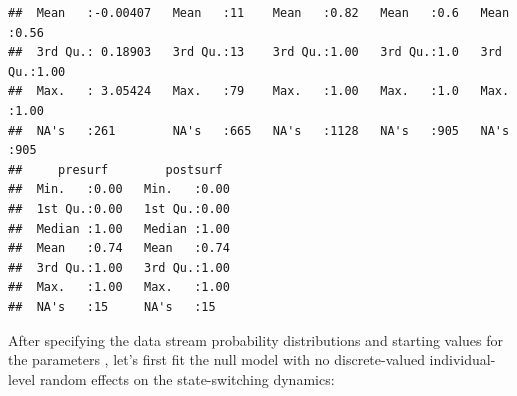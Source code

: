 \documentclass[12pt]{article}\usepackage[]{graphicx}\usepackage[]{xcolor}
\makeatletter
\newenvironment{kframe}{%
 \def\at@end@of@kframe{}%
 \ifinner\ifhmode%
  \def\at@end@of@kframe{\end{minipage}}%
  \begin{minipage}{\columnwidth}%
 \fi\fi%
 \def\FrameCommand##1{\hskip\@totalleftmargin \hskip-\fboxsep
 \colorbox{shadecolor}{##1}\hskip-\fboxsep
     \hskip-\linewidth \hskip-\@totalleftmargin \hskip\columnwidth}%
 \MakeFramed {\advance\hsize-\width
   \@totalleftmargin\z@ \linewidth\hsize
   \@setminipage}}%
 {\par\unskip\endMakeFramed%
 \at@end@of@kframe}
\newenvironment{knitrout}{}{} %
\makeatother
\begin{document}
\begin{knitrout}
\begin{kframe}
\begin{verbatim}
##  Mean   :-0.00407   Mean   :11    Mean   :0.82   Mean   :0.6   Mean   :0.56  
##  3rd Qu.: 0.18903   3rd Qu.:13    3rd Qu.:1.00   3rd Qu.:1.0   3rd Qu.:1.00  
##  Max.   : 3.05424   Max.   :79    Max.   :1.00   Max.   :1.0   Max.   :1.00  
##  NA's   :261        NA's   :665   NA's   :1128   NA's   :905   NA's   :905   
##     presurf        postsurf   
##  Min.   :0.00   Min.   :0.00  
##  1st Qu.:0.00   1st Qu.:0.00  
##  Median :1.00   Median :1.00  
##  Mean   :0.74   Mean   :0.74  
##  3rd Qu.:1.00   3rd Qu.:1.00  
##  Max.   :1.00   Max.   :1.00  
##  NA's   :15     NA's   :15
\end{verbatim}
\end{kframe}
\end{knitrout}

After specifying the data stream probability distributions and starting values for the parameters \citep[based on those reported by ][]{IsojunnoEtAl2017}, let's first fit the null model with no discrete-valued individual-level random effects on the state-switching dynamics:
\end{document}

